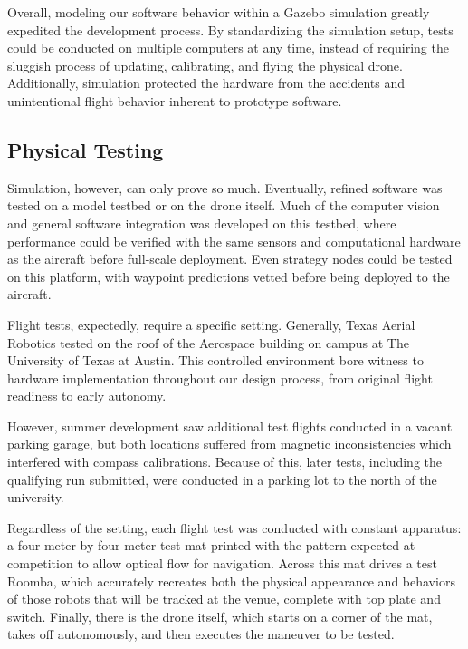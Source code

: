 \documentclass[12pt,letterpaper]{article}
\begin{document}
		Overall, modeling our software behavior within a Gazebo simulation greatly expedited the development process. By standardizing the simulation setup, tests could be conducted on multiple computers at any time, instead of requiring the sluggish process of updating, calibrating, and flying the physical drone. Additionally, simulation protected the hardware from the accidents and unintentional flight behavior inherent to prototype software.


	\subsection*{Physical Testing}
		Simulation, however, can only prove so much. Eventually, refined software was tested on a model testbed or on the drone itself. Much of the computer vision and general software integration was developed on this testbed, where performance could be verified with the same sensors and computational hardware as the aircraft before full-scale deployment. Even strategy nodes could be tested on this platform, with waypoint predictions vetted before being deployed to the aircraft.

		Flight tests, expectedly, require a specific setting. Generally, Texas Aerial Robotics tested on the roof of the Aerospace building on campus at The University of Texas at Austin. This controlled environment bore witness to hardware implementation throughout our design process, from original flight readiness to early autonomy.

		However, summer development saw additional test flights conducted in a vacant parking garage, but both locations suffered from magnetic inconsistencies which interfered with compass calibrations. Because of this, later tests, including the qualifying run submitted, were conducted in a parking lot to the north of the university.

		Regardless of the setting, each flight test was conducted with constant apparatus: a four meter by four meter test mat printed with the pattern expected at competition to allow optical flow for navigation. Across this mat drives a test Roomba, which accurately recreates both the physical appearance and behaviors of those robots that will be tracked at the venue, complete with top plate and switch. Finally, there is the drone itself, which starts on a corner of the mat, takes off autonomously, and then executes the maneuver to be tested.
\end{document}
